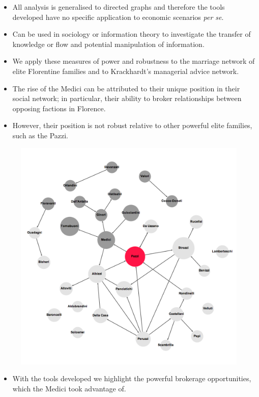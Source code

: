 \documentclass[10pt]{beamer}
\begin{document}
\begin{frame}
\begin{itemize}
\item All analysis is generalised to directed graphs and therefore the tools developed have no specific application to economic scenarios \emph{per se}.
\medskip
\item Can be used in sociology or information theory to investigate the transfer of knowledge or flow and potential manipulation of information.
\medskip
\item We apply these measures of power and robustness to the marriage network of elite Florentine families and to Krackhardt's managerial advice network.
\medskip
\item The rise of the Medici can be attributed to their unique position in their social network; in particular, their ability to broker relationships between opposing factions in Florence.
\medskip
\item However, their position is not robust relative to other powerful elite families, such as the Pazzi.
\end{itemize}
\end{frame}


\begin{frame}
\begin{figure}[h]
\centering
\includegraphics[scale=0.17]{../Images/Florentine-marr.png}
\end{figure}
\begin{itemize}
\item With the tools developed we highlight the powerful brokerage opportunities, which the Medici took advantage of.
\end{itemize}
\end{frame}
\end{document}
